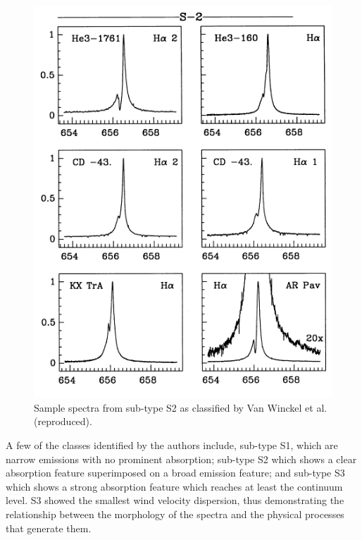 \begin{figure}[!htb]
\centering
\includegraphics[scale=0.75]{figures/van.png}
\caption{Sample spectra from sub-type S2 as classified by Van Winckel et al. (reproduced).}
\end{figure}

A few of the classes identified by the authors include, sub-type S1, which are narrow emissions with no prominent absorption; sub-type S2 which shows a clear absorption feature superimposed on a broad emission feature; and sub-type S3 which shows a strong absorption feature which reaches at least the continuum level. S3 showed the smallest wind velocity dispersion, thus demonstrating the relationship between the morphology of the spectra and the physical processes that generate them.


